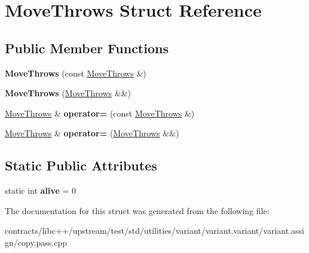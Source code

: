 \hypertarget{struct_move_throws}{}\section{Move\+Throws Struct Reference}
\label{struct_move_throws}
\subsection*{Public Member Functions}
\begin{DoxyCompactItemize}
\item 
\mbox{\label{struct_move_throws_a28831df718fdabd2576ecf2fc565bb1d}} 
{\bfseries Move\+Throws} (const \mbox{\hyperlink{struct_move_throws}{Move\+Throws}} \&)
\item 
\mbox{\label{struct_move_throws_a14c0019a1e06d99190db2112110c2f41}} 
{\bfseries Move\+Throws} (\mbox{\hyperlink{struct_move_throws}{Move\+Throws}} \&\&)
\item 
\mbox{\label{struct_move_throws_abd09c83e497f134ba93d60acce61d407}} 
\mbox{\hyperlink{struct_move_throws}{Move\+Throws}} \& {\bfseries operator=} (const \mbox{\hyperlink{struct_move_throws}{Move\+Throws}} \&)
\item 
\mbox{\label{struct_move_throws_a11c7789a012d3bfa628a98829880a0bc}} 
\mbox{\hyperlink{struct_move_throws}{Move\+Throws}} \& {\bfseries operator=} (\mbox{\hyperlink{struct_move_throws}{Move\+Throws}} \&\&)
\end{DoxyCompactItemize}
\subsection*{Static Public Attributes}
\begin{DoxyCompactItemize}
\item 
\mbox{\label{struct_move_throws_a2ace7d33088f337e7f1d3d0a5728f3a8}} 
static int {\bfseries alive} = 0
\end{DoxyCompactItemize}


The documentation for this struct was generated from the following file\+:\begin{DoxyCompactItemize}
\item 
contracts/libc++/upstream/test/std/utilities/variant/variant.\+variant/variant.\+assign/copy.\+pass.\+cpp\end{DoxyCompactItemize}

